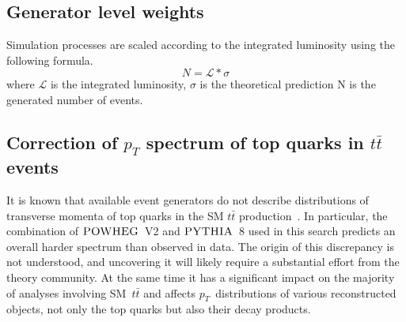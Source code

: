 \subsection{Generator level weights}
\label{sec:genweights}
 Simulation processes are scaled according to the integrated luminosity using the following formula.
 \begin{equation}
 N = \mathcal{L} * \sigma
\end{equation}  
where $\mathcal{L}$ is the integrated luminosity, $\sigma$ is the theoretical prediction N is the generated number of events.
\subsection{Correction of $p_{T}$ spectrum of top quarks in $t\bar{t}$ events}
\label{Sec:TopPtReweighting}
%
It is known that available event generators do not describe distributions of transverse momenta of top quarks in the SM $t\bar t$ production~\cite{Khachatryan:2015oqa, Khachatryan:2015fwh, Khachatryan:2016mnb, CMS-PAS-TOP-16-007}.
In particular, the combination of $\textsc{POWHEG}$~V2 and $\textsc{PYTHIA}$~8 used in this search predicts an overall harder spectrum than observed in data.
The origin of this discrepancy is not understood, and uncovering it will likely require a substantial effort from the theory community.
At the same time it has a significant impact on the majority of analyses involving SM~$t\bar{t}$ and affects $p_{T}$~distributions of various reconstructed objects, not only the top quarks but also their decay products.


